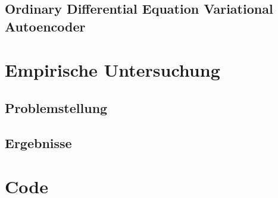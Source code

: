 \documentclass[12pt]{article}
\begin{document}
	\subsection[ODE$^2$-VAE]{Ordinary Differential Equation Variational Autoencoder}

	
	\section[Empirische Untersuchung]{Empirische Untersuchung}
	\subsection[Problemstellung]{Problemstellung}
	\subsection[Ergebnisse]{Ergebnisse}
	\section[Code]{Code}
\end{document}
